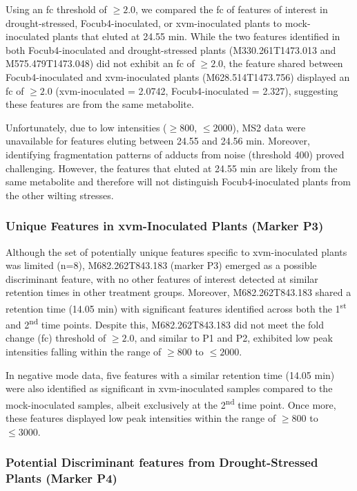 Using an \ac{fc} threshold of $\ge2.0$, we compared the \ac{fc} of features of interest in drought-stressed, \ac{Focub4}-inoculated, or \ac{xvm}-inoculated plants to mock-inoculated plants that eluted at 24.55 min. While the two features identified in both \ac{Focub4}-inoculated and drought-stressed plants (M330.261T1473.013 and M575.479T1473.048) did not exhibit an \ac{fc} of $\geq2.0$, the feature shared between \ac{Focub4}-inoculated and \ac{xvm}-inoculated plants (M628.514T1473.756) displayed an \ac{fc} of $\geq2.0$ (\ac{xvm}-inoculated = 2.0742, \ac{Focub4}-inoculated = 2.327), suggesting these features are from the same metabolite. 
 
Unfortunately, due to low intensities ($\geq800$, $\leq2000$), MS2 data were unavailable for features eluting between 24.55 and 24.56 min. Moreover, identifying fragmentation patterns of adducts from noise (threshold 400) proved challenging. However, the features that eluted at 24.55 min are likely from the same metabolite and therefore will not distinguish \ac{Focub4}-inoculated plants from the other wilting stresses.

\subsubsection{Unique Features in \acl{xvm}-Inoculated Plants (Marker P3)}

Although the set of potentially unique features specific to \ac{xvm}-inoculated plants was limited (n=8), M682.262T843.183  (marker P3) emerged as a possible discriminant feature, with no other features of interest detected at similar retention times in other treatment groups. Moreover, M682.262T843.183 shared a retention time (14.05 min) with significant features identified across both the 1\textsuperscript{st} and 2\textsuperscript{nd} time points. Despite this, M682.262T843.183 did not meet the fold change (\ac{fc}) threshold of $\geq2.0$, and similar to P1 and P2, exhibited low peak intensities falling within the range of $\geq800$ to $\leq2000$.

In negative mode data, five features with a similar retention time (14.05 min) were also identified as significant in \ac{xvm}-inoculated samples compared to the mock-inoculated samples, albeit exclusively at the 2\textsuperscript{nd} time point. Once more, these features displayed low peak intensities within the range of $\geq800$ to $\leq3000$.

\subsubsection{Potential Discriminant features from Drought-Stressed Plants (Marker P4)}

